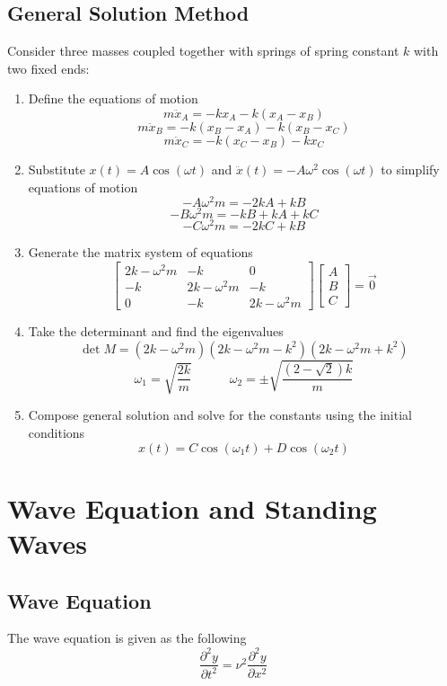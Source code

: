 \documentclass[11pt]{article}
\begin{document}
\subsection{General Solution Method}
Consider three masses coupled together with springs of spring constant $k$  with two fixed ends:
\begin{enumerate}
\item Define the equations of motion
$$ m\ddot{x}_A = -kx_A - k(x_A-x_B)$$
$$ m\ddot{x}_B = -k(x_B-x_A) -  k(x_B-x_C)$$
$$ m\ddot{x}_C = -k(x_C-x_B) - kx_C $$
\item Substitute $x(t) = A \cos (\omega t)$ and $ \ddot{x}(t) = -A\omega^2 \cos (\omega t)$ to simplify equations of motion 
$$ -A\omega^2m= -2kA + kB$$
$$ -B\omega^2m = -kB + kA +kC$$
$$ -C\omega^2m = -2kC +kB$$
\item Generate the matrix system of equations
$$ \begin{bmatrix}
2k - \omega^2m&-k&0 \\
-k&2k - \omega^2m&-k \\
0&-k&2k - \omega^2m 
\end{bmatrix}
\begin{bmatrix}
A\\
B\\
C
\end{bmatrix}
= \vec{0}$$
\item Take the determinant and find the eigenvalues
$$ \det{M} = (2k-\omega^2m)(2k-\omega^2m-k^2)(2k-\omega^2m+k^2)$$
$$ \omega_1 = \sqrt{\frac{2k}{m}} \quad \quad \quad \omega_2 = \pm \sqrt{\frac{(2-\sqrt{2})k}{m}} $$
\item Compose general solution and solve for the constants using the initial conditions
$$x(t) = C\cos(\omega_1 t) + D\cos(\omega_2 t) $$
\end{enumerate}
\pagebreak
\section{Wave Equation and Standing Waves}
\subsection{Wave Equation}
The wave equation is given as the following 
$$ \frac{\partial ^2 y}{\partial t^2} = \nu^2\frac{\partial^2 y}{\partial x^2}$$
\end{document}
